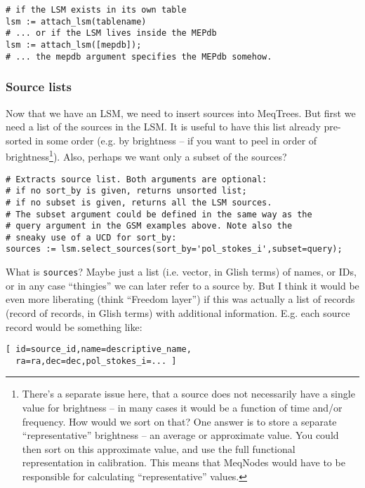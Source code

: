 \documentclass[]{lofar}
\begin{document}
\begin{verbatim}
# if the LSM exists in its own table
lsm := attach_lsm(tablename)
# ... or if the LSM lives inside the MEPdb
lsm := attach_lsm([mepdb]);
# ... the mepdb argument specifies the MEPdb somehow.
\end{verbatim}
  
\subsubsection{Source lists}
  
  Now that we have an LSM, we need to insert sources into MeqTrees. But first we
  need a list of the sources in the LSM. It is useful to have this list already
  pre-sorted in some order (e.g. by brightness -- if you want to peel in order of
  brightness\footnote{There's a separate issue here, that a source does not 
  necessarily have a single value for brightness -- in many cases it would
  be a function of time and/or frequency. How would we sort on that? One answer is
  to store a separate ``representative'' brightness -- an average or 
  approximate value. You could then sort on this approximate value, and use
  the full functional representation in calibration. This means that MeqNodes
  would have to be responsible for calculating ``representative'' values.}). 
  Also, perhaps we want only a subset of the sources?
  
\begin{verbatim} 
# Extracts source list. Both arguments are optional: 
# if no sort_by is given, returns unsorted list; 
# if no subset is given, returns all the LSM sources.
# The subset argument could be defined in the same way as the 
# query argument in the GSM examples above. Note also the 
# sneaky use of a UCD for sort_by:
sources := lsm.select_sources(sort_by='pol_stokes_i',subset=query); 
\end{verbatim}
  
  What is {\tt sources}? Maybe just a list (i.e. vector, in Glish terms) of
  names, or IDs, or in any case ``thingies'' we can later refer to a source by.
  But I think it would be even more liberating (think ``Freedom layer'') if this
  was actually a list of records (record of records, in Glish terms) with
  additional information. E.g. each source record would be something like:
  
\begin{verbatim}
[ id=source_id,name=descriptive_name,
  ra=ra,dec=dec,pol_stokes_i=... ]
\end{verbatim}
  
\end{document}
